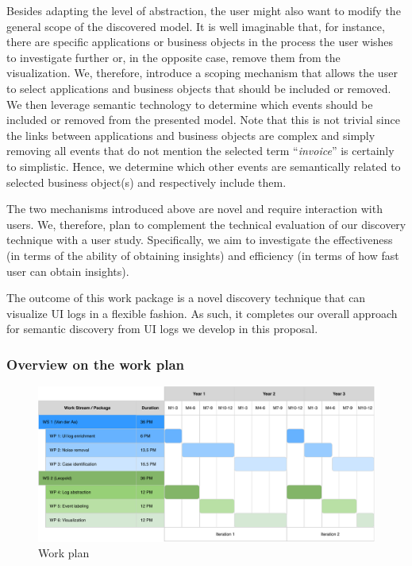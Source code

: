  Besides adapting the level of abstraction, the user might also want to modify the general scope of the discovered model. It is well imaginable that, for instance, there are specific applications or business objects in the process the user wishes to investigate further or, in the opposite case, remove them from the visualization. We, therefore, introduce a scoping  mechanism that allows the user to select applications and business objects that should be included or removed. We then leverage semantic technology to determine which events should be included or removed from the presented model. Note that this is not trivial since the links between applications and business objects are complex and simply removing all events that do not mention the selected term ``\textit{invoice}'' is certainly to simplistic. Hence, we determine which other events are semantically related to selected business object(s) and respectively include them.    

 The two mechanisms introduced above are novel and require interaction with users. We, therefore, plan to complement the technical evaluation of our discovery technique with a user study. Specifically, we aim to investigate the effectiveness (in terms of the ability of obtaining insights) and efficiency (in terms of how fast user can obtain insights).      

 The outcome of this work package is a novel discovery technique that can visualize UI logs in a flexible fashion. As such, it completes our overall approach for semantic discovery from UI logs we develop in this proposal. 



\subsubsection{Overview on the work plan}

\begin{figure}[bt]
\includegraphics[width=\textwidth]{Figures/Gantt.pdf}
\caption{Work plan}
\label{fig:workplan}
\end{figure}

